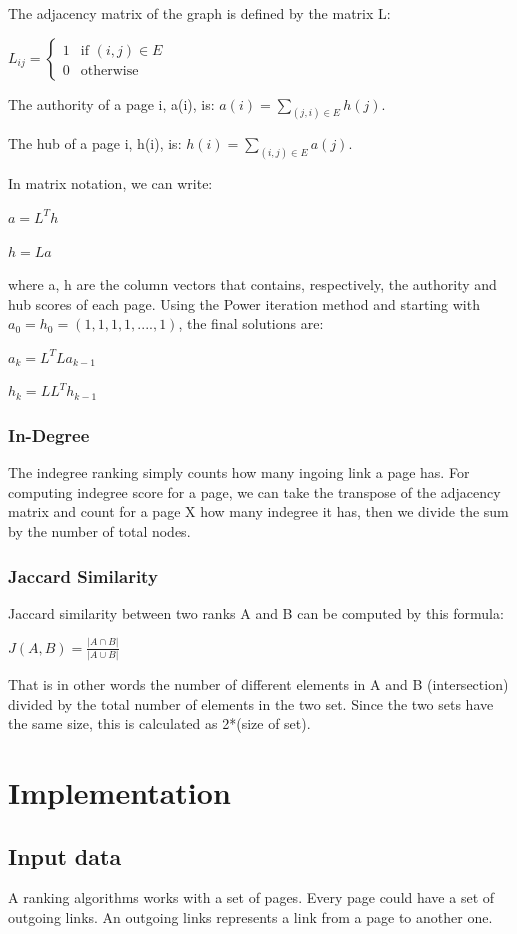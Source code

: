 \documentclass[10pt]{article}
\begin{document}
The adjacency matrix of the graph is defined by the matrix L:

$L_{ij} = \begin{cases} 1 & \mbox{if } (i,j) \in E \\ 0 & \mbox{otherwise}\end{cases}$

The authority of a page i, a(i), is: $a(i)=\sum_{(j,i) \in E}h(j)$. 

The hub of a page i, h(i), is: $h(i)=\sum_{(i,j) \in E}a(j)$.

In matrix notation, we can write:

$a = L^Th$

$h = La$

where a, h are the column vectors that contains, respectively, the authority and hub scores of each page.
Using the Power iteration method and starting with $a_0=h_0=(1,1,1,1,....,1)$, the final solutions are:

$a_k = L^TLa_{k-1}$

$h_k = LL^Th_{k-1}$

\subsubsection{In-Degree}
The indegree ranking simply counts how many ingoing link a page has. For computing indegree score for a page, we can take the transpose of the adjacency matrix and count for a page X how many indegree it has, then we divide the sum by the number of total nodes.
\subsubsection{Jaccard Similarity}
Jaccard similarity between two ranks A and B can be computed by this formula:

$J(A,B) = \frac{|A \cap B|}{|A \cup B|}$

That is in other words the number of different elements in A and B (intersection) divided by the total number of elements in the two set. Since the two sets have the same size, this is calculated as 2*(size of set).
\section{Implementation}
\subsection{Input data}
A ranking algorithms works with a set of pages. Every page could have a set of outgoing links. An outgoing links represents a link from a page to another one. 
\end{document}
